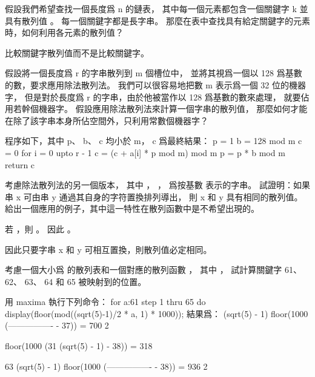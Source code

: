\startsection[
  title={Hash functions},
]

\startEXERCISE
假設我們希望查找一個長度爲 n 的鏈表，
其中每一個元素都包含一個關鍵字 k 並具有散列值 。
每一個關鍵字都是長字串。
那麼在表中查找具有給定關鍵字的元素時，如何利用各元素的散列值？
\stopEXERCISE

\startANSWER
比較關鍵字散列值而不是比較關鍵字。
\stopANSWER

\startEXERCISE
假設將一個長度爲 r 的字串散列到 m 個槽位中，
並將其視爲一個以 128 爲基數的數，要求應用除法散列法。
我們可以很容易地把數 m 表示爲一個 32 位的機器字，
但是對於長度爲 r 的字串，由於他被當作以 128 爲基數的數來處理，
就要佔用若幹個機器字。
假設應用除法散列法來計算一個字串的散列值，
那麼如何才能在除了該字串本身所佔空間外，只利用常數個機器字？
\stopEXERCISE

\startANSWER
程序如下，其中 p、 b、 c 均小於 m， c 爲最終結果：
\startCLRS
p = 1
b = 128 mod m
c = 0
for i = 0 upto r - 1
	c = (c + a[i] * p mod m) mod m
	p = p * b mod m
return c
\stopCLRS
\stopANSWER

\startEXERCISE
考慮除法散列法的另一個版本，
其中 ， ，  爲按基數  表示的字串。
試證明：如果串 x 可由串 y 通過其自身的字符置換排列導出，
則 x 和 y 具有相同的散列值。
給出一個應用的例子，其中這一特性在散列函數中是不希望出現的。
\stopEXERCISE

\startANSWER
若 ，則 。
因此 。

因此只要字串 x 和 y 可相互置換，則散列值必定相同。
\stopANSWER

\startEXERCISE
考慮一個大小爲  的散列表和一個對應的散列函數 ，
其中 ，
試計算關鍵字 61、 62、 63、 64 和 65 被映射到的位置。
\stopEXERCISE

\startANSWER
用 maxima 執行下列命令：
\startcodebox
for a:61 step 1 thru 65 do display(floor(mod((sqrt(5)-1)/2 * a, 1) * 1000));
\stopcodebox
結果爲：
 (sqrt(5) - 1)
                   floor(1000 (---------------- - 37)) = 700
                                      2

                   floor(1000 (31 (sqrt(5) - 1) - 38)) = 318

                               63 (sqrt(5) - 1)
                   floor(1000 (---------------- - 38)) = 936
                                      2

